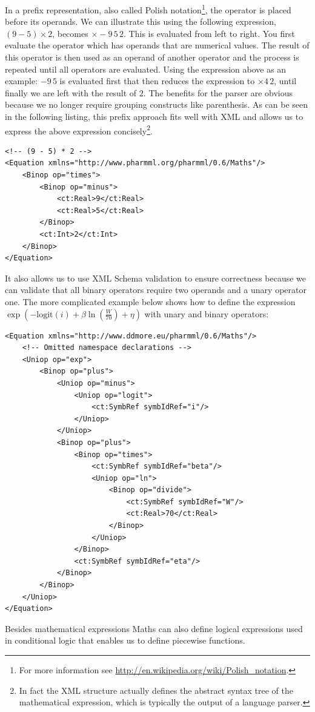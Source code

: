 In a prefix representation, also called Polish notation\footnote{For
  more information see
  \url{http://en.wikipedia.org/wiki/Polish_notation}.}, the operator is
placed before its operands. We can illustrate this using the following
expression, $(9 - 5) \times 2$, becomes $\times-9\,5\,2$. This is
evaluated from left to right. You first evaluate the operator which
has operands that are numerical values. The result of this operator is
then used as an operand of another operator and the process is
repeated until all operators are evaluated. Using the expression above
as an example: $-9\,5$ is evaluated first that then reduces the
expression to $\times 4\,2$, until finally we are left with the result
of $2$. The benefits for the parser are obvious because we no longer
require grouping constructs like parenthesis. As can be seen in the
following listing, this prefix approach fits well with XML and allows
us to express the above expression concisely\footnote{In fact the XML
  structure actually defines the abstract syntax tree of the
  mathematical expression, which is typically the output of a language
  parser.}.
%
\lstset{language=XML}
\begin{lstlisting}
<!-- (9 - 5) * 2 -->
<Equation xmlns="http://www.pharmml.org/pharmml/0.6/Maths"/>
    <Binop op="times">
        <Binop op="minus">
            <ct:Real>9</ct:Real>
            <ct:Real>5</ct:Real>
        </Binop>
        <ct:Int>2</ct:Int>
    </Binop>
</Equation>
\end{lstlisting}
%
It also allows us to use XML Schema validation to ensure correctness
because we can validate that all binary operators require two operands
and a unary operator one. The more complicated example below shows how
to define the expression $\exp\left(-\textrm{logit}(i) + \beta
  \ln\left(\frac{W}{70}\right)+\eta\right)$ with unary and binary
operators:
%
\lstset{language=XML}
\begin{lstlisting}
<Equation xmlns="http://www.ddmore.eu/pharmml/0.6/Maths"/>
    <!-- Omitted namespace declarations -->
    <Uniop op="exp">
        <Binop op="plus">
            <Uniop op="minus">
                <Uniop op="logit">
                    <ct:SymbRef symbIdRef="i"/>
                </Uniop>
            </Uniop>
            <Binop op="plus">
                <Binop op="times">
                    <ct:SymbRef symbIdRef="beta"/>
                    <Uniop op="ln">
                        <Binop op="divide">
                            <ct:SymbRef symbIdRef="W"/>
                            <ct:Real>70</ct:Real>
                        </Binop>
                    </Uniop>
                </Binop>
                <ct:SymbRef symbIdRef="eta"/>
            </Binop>
        </Binop>
    </Uniop>
</Equation>
\end{lstlisting}
%
Besides mathematical expressions \pharmml Maths can also define logical
expressions used in conditional logic that enables us to define
piecewise functions. %

